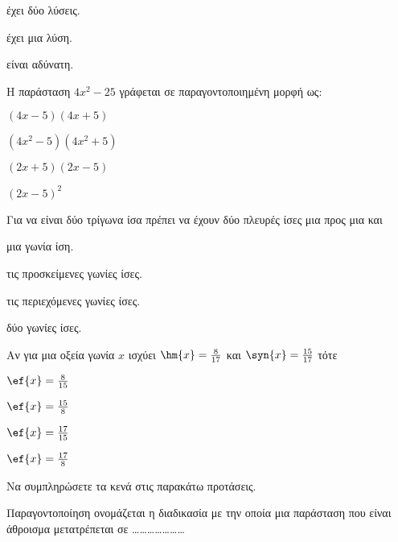 \documentclass[twoside,nofonts,internet,math,spyros]{frontisthrio-diag}
\begin{document}
\begin{thema}
\begin{erwthma}
\begin{alist}
\begin{multicols}{3}
\begin{rlist}
\item έχει δύο λύσεις.
\item έχει μια λύση.
\item είναι αδύνατη.
\end{rlist}
\end{multicols}
\item Η παράσταση $ 4x^2-25 $ γράφεται σε παραγοντοποιημένη μορφή ως:
\begin{multicols}{4}
\begin{rlist}
\item $ (4x-5)(4x+5) $
\item $ (4x^2-5)(4x^2+5) $
\item $ (2x+5)(2x-5) $
\item $ (2x-5)^2 $
\end{rlist}
\end{multicols}
\item Για να είναι δύο τρίγωνα ίσα πρέπει να έχουν δύο πλευρές ίσες μια προς μια και 
\begin{multicols}{2}
\begin{rlist}
\item μια γωνία ίση.
\item τις προσκείμενες γωνίες ίσες.
\item τις περιεχόμενες γωνίες ίσες.
\item δύο γωνίες ίσες.
\end{rlist}
\end{multicols}
\item Αν για μια οξεία γωνία $ x $ ισχύει $ \hm{x}=\frac{8}{17} $ και $ \syn{x}=\frac{15}{17} $ τότε
\begin{multicols}{4}
\begin{rlist}
\item $ \ef{x}=\frac{8}{15} $
\item $ \ef{x}=\frac{15}{8} $
\item $ \ef{x}=\frac{17}{15} $
\item $ \ef{x}=\frac{17}{8} $
\end{rlist}
\end{multicols}
\end{alist}
\item Να συμπληρώσετε τα κενά στις παρακάτω προτάσεις.
\begin{alist}
\item Παραγοντοποίηση ονομάζεται η διαδικασία με την οποία μια παράσταση που είναι άθροισμα μετατρέπεται σε \ldots\ldots\ldots\ldots\ldots\ldots\ldots

\end{alist}
\end{erwthma}
\end{thema}
\end{document}
